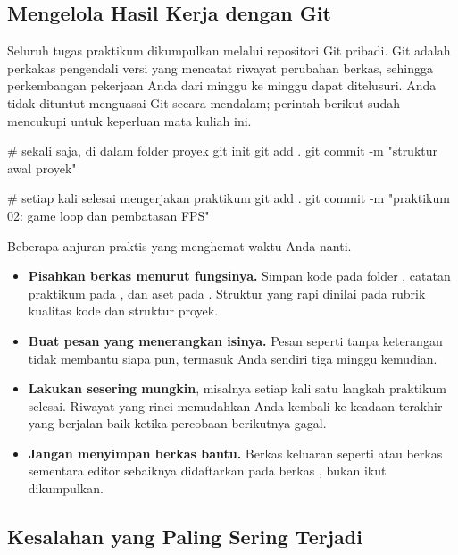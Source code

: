 \subsection{Mengelola Hasil Kerja dengan Git}

Seluruh tugas praktikum dikumpulkan melalui repositori Git pribadi. Git adalah
perkakas pengendali versi yang mencatat riwayat perubahan berkas, sehingga
perkembangan pekerjaan Anda dari minggu ke minggu dapat ditelusuri. Anda tidak
dituntut menguasai Git secara mendalam; perintah berikut sudah mencukupi
untuk keperluan mata kuliah ini.

\begin{kodekeluaran}
# sekali saja, di dalam folder proyek
git init
git add .
git commit -m "struktur awal proyek"

# setiap kali selesai mengerjakan praktikum
git add .
git commit -m "praktikum 02: game loop dan pembatasan FPS"
\end{kodekeluaran}

Beberapa anjuran praktis yang menghemat waktu Anda nanti.

\begin{itemize}
  \item \textbf{Pisahkan berkas menurut fungsinya.} Simpan kode pada folder
        , catatan praktikum pada , dan aset pada
        . Struktur yang rapi dinilai pada rubrik kualitas kode
        dan struktur proyek.
  \item \textbf{Buat pesan  yang menerangkan isinya.} Pesan
        seperti  tanpa keterangan tidak membantu siapa pun,
        termasuk Anda sendiri tiga minggu kemudian.
  \item \textbf{Lakukan  sesering mungkin}, misalnya setiap
        kali satu langkah praktikum selesai. Riwayat yang rinci memudahkan
        Anda kembali ke keadaan terakhir yang berjalan baik ketika percobaan
        berikutnya gagal.
  \item \textbf{Jangan menyimpan berkas bantu.} Berkas keluaran seperti
         atau berkas sementara editor sebaiknya
        didaftarkan pada berkas , bukan ikut dikumpulkan.
\end{itemize}

\subsection{Kesalahan yang Paling Sering Terjadi}

